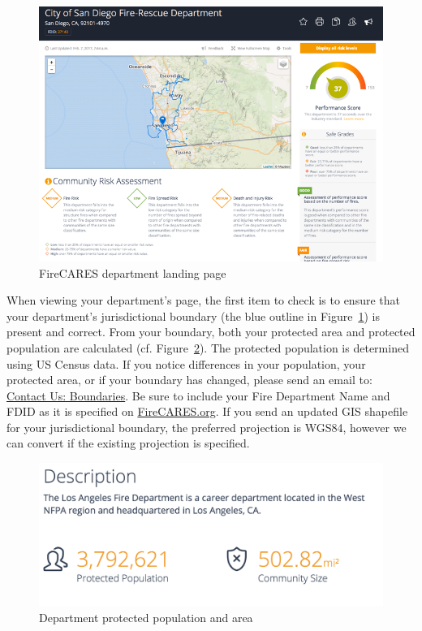 \documentclass[12pt,oneside]{book}
\begin{document}
\begin{figure}[ht!]
\centering
\includegraphics[width=.9\columnwidth]{Figures/department_page}
\caption{FireCARES department landing page}
\label{fig:department_page}
\end{figure}

When viewing your department's page, the first item to check is to ensure that your department's jurisdictional boundary (the blue outline in Figure~\ref{fig:department_page}) is present and correct.  From your boundary, both your protected area and protected population are calculated (cf. Figure~\ref{fig:description}). The protected population is determined using US Census data. If you notice differences in your population, your protected area, or if your boundary has changed, please send an email to: \href{mailto:boundaries@firecares.org}{Contact Us: Boundaries}. Be sure to include your Fire Department Name and FDID as it is specified on \href{https://www.FireCARES.org}{FireCARES.org}. If you send an updated GIS shapefile for your jurisdictional boundary, the preferred projection is WGS84, however we can convert if the existing projection is specified.

\begin{figure}[ht!]
\centering
\includegraphics[width=.9\columnwidth]{Figures/description}
\caption{Department protected population and area}
\label{fig:description}
\end{figure}
\end{document}
